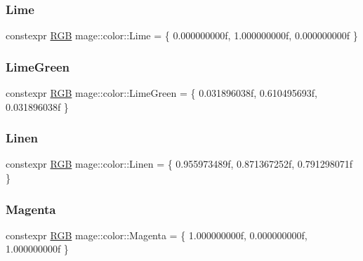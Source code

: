 \mbox{\label{namespacemage_1_1color_ad30a72922fc74a93b1d86e6da0fe3edb}} 
\subsubsection{\texorpdfstring{Lime}{Lime}}
{\footnotesize\ttfamily constexpr \mbox{\hyperlink{structmage_1_1_r_g_b}{R\+GB}} mage\+::color\+::\+Lime = \{ 0.\+000000000f, 1.\+000000000f, 0.\+000000000f \}}

\mbox{\label{namespacemage_1_1color_a164223d6970354e460665eaf3d163d47}} 
\subsubsection{\texorpdfstring{Lime\+Green}{LimeGreen}}
{\footnotesize\ttfamily constexpr \mbox{\hyperlink{structmage_1_1_r_g_b}{R\+GB}} mage\+::color\+::\+Lime\+Green = \{ 0.\+031896038f, 0.\+610495693f, 0.\+031896038f \}}

\mbox{\label{namespacemage_1_1color_add4a34c183b39c88f3e4ff8d627f5637}} 
\subsubsection{\texorpdfstring{Linen}{Linen}}
{\footnotesize\ttfamily constexpr \mbox{\hyperlink{structmage_1_1_r_g_b}{R\+GB}} mage\+::color\+::\+Linen = \{ 0.\+955973489f, 0.\+871367252f, 0.\+791298071f \}}

\mbox{\label{namespacemage_1_1color_ace3bc5380195732597310bea2764a6bd}} 
\subsubsection{\texorpdfstring{Magenta}{Magenta}}
{\footnotesize\ttfamily constexpr \mbox{\hyperlink{structmage_1_1_r_g_b}{R\+GB}} mage\+::color\+::\+Magenta = \{ 1.\+000000000f, 0.\+000000000f, 1.\+000000000f \}}

